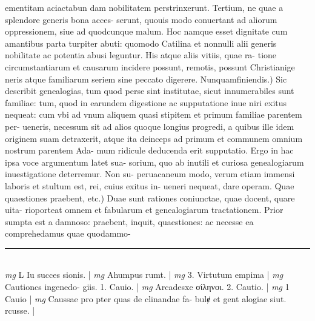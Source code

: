 \documentclass{article}
\begin{document}
\begin{pages}
ementitam aciactabun dam nobilitatem perstrinxerunt. Tertium, ne quae a splendore generis bona acces- serunt, quouis modo conuertant ad aliorum oppressionem, siue ad quodcunque  malum. Hoc namque  esset dignitate cum amantibus parta turpiter abuti: quomodo Catilina et nonnulli alii generis nobilitate ac potentia abusi leguntur. His atque  aliis vitiis, quae ra- tione circumstantiarum et causarum incidere possunt, remotis, possunt Christianige neris atque  familiarum seriem sine peccato digerere.  \pend\pstart Nunquamfiniendis.) Sic describit genealogias, tum quod perse sint institutae, sicut innumerabiles sunt familiae: tum, quod in earundem digestione ac supputatione inue niri exitus nequeat: cum vbi ad vnum aliquem quasi stipitem et primum familiae parentem per- ueneris, necessum sit ad alios quoque  longius progredi, a quibus ille idem originem suam detraxerit, atque  ita deinceps ad primum et communem omnium nostrum parentem Ada- mum ridicule deducenda erit supputatio. Ergo in hac ipsa voce argumentum latet sua- sorium, quo ab inutili et curiosa genealogiarum inuestigatione deterremur. Non su- peruacaneum modo, verum etiam immensi laboris et stultum est, rei, cuius exitus in- ueneri nequeat, dare operam.  \pend\pstart Quae quaestiones praebent, etc.) Duae sunt rationes coniunctae, quae docent, quare uita- rioporteat omnem et fabularum et genealogiarum tractationem. Prior sumpta est a damnoso: praebent, inquit, quaestiones: ac necesse ea comprehedamus quae quodammo-  \pend
\vspace{0.5cm}\noindent
\vspace{0.2cm}\rule{1cm}{0.2pt}\\ 
\hspace{0.2cm}\textit{mg}
\footnotesize L Iu succes sionis. 
\normalsize| 
\hspace{0.2cm}\textit{mg}
\footnotesize Ahumpus rumt. 
\normalsize| 
\hspace{0.2cm}\textit{mg}
\footnotesize 3. Virtutum empima 
\normalsize| 
\hspace{0.2cm}\textit{mg}
\footnotesize Cautioncs ingenedo- giis. 1. Cauio. 
\normalsize| 
\hspace{0.2cm}\textit{mg}
\footnotesize Arcadesxe σίληνοι. 2. Cautio. 
\normalsize| 
\hspace{0.2cm}\textit{mg}
\footnotesize 1 Cauio 
\normalsize| 
\hspace{0.2cm}\textit{mg}
\footnotesize Caussae pro pter quas de clinandae fa- bulɇ et gent alogiae siut. rcusse. 
\normalsize| 

\end{pages}
\end{document}
